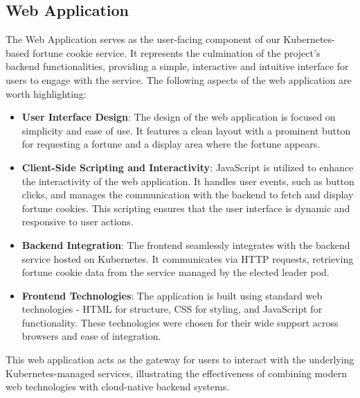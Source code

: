 \documentclass{article}
\begin{document}
  \subsection{Web Application}
    The Web Application serves as the user-facing component of our Kubernetes-based fortune cookie service. It represents the culmination of the project's backend functionalities, providing a simple, interactive and intuitive interface for users to engage with the service. The following aspects of the web application are worth highlighting:
    \begin{itemize}
      \item \textbf{User Interface Design}: The design of the web application is focused on simplicity and ease of use. It features a clean layout with a prominent button for requesting a fortune and a display area where the fortune appears.
      \item \textbf{Client-Side Scripting and Interactivity}: JavaScript is utilized to enhance the interactivity of the web application. It handles user events, such as button clicks, and manages the communication with the backend to fetch and display fortune cookies. This scripting ensures that the user interface is dynamic and responsive to user actions.
      \item \textbf{Backend Integration}: The frontend seamlessly integrates with the backend service hosted on Kubernetes. It communicates via HTTP requests, retrieving fortune cookie data from the service managed by the elected leader pod.
      \item \textbf{Frontend Technologies}: The application is built using standard web technologies - HTML for structure, CSS for styling, and JavaScript for functionality. These technologies were chosen for their wide support across browsers and ease of integration.
    \end{itemize}
    
    This web application acts as the gateway for users to interact with the underlying Kubernetes-managed services, illustrating the effectiveness of combining modern web technologies with cloud-native backend systems.
    
  
\end{document}
